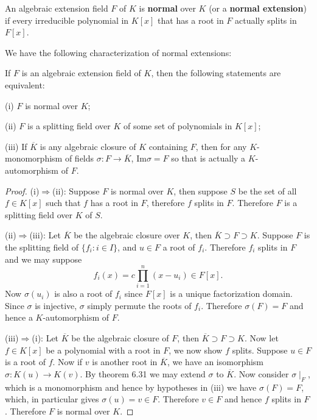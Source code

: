 \begin{definition}
An algebraic extension field $F$ of $K$ is \textbf{normal} over $K$ (or a \textbf{normal extension}) if every irreducible polynomial in $K[x]$ that has a root in $F$ actually splits in $F[x]$.
\end{definition}
We have the following characterization of normal extensions: 
\begin{theorem}
If $F$ is an algebraic extension field of $K$, then the following statements are equivalent: \par
(i) $F$ is normal over $K$;\par
(ii) $F$ is a splitting field over $K$ of some set of polynomials in $K[x]$;\par
(iii) If $\overline{K}$ is any algebraic closure of $K$ containing $F$, then for any $K$-monomorphism of fields $\sigma:F\to\overline{K}$, $\mathrm{Im}\sigma=F$ so that is actually a $K$-automorphism of $F$.
\end{theorem}
\begin{proof}
(i)$\Rightarrow$(ii): Suppose $F$ is normal over $K$, then suppose $S$ be the set of all $f\in K[x]$ such that $f$ has a root in $F$, therefore $f$ splits in $F$. Therefore $F$ is a splitting field over $K$ of $S$.\par
(ii)$\Rightarrow$(iii): Let $\overline{K}$ be the algebraic closure over $K$, then $\overline{K}\supset F\supset K$. Suppose $F$ is the splitting field of $\{f_i:i\in I\}$, and $u\in F$ a root of $f_i$. Therefore $f_i$ splits in $F$ and we may suppose 
$$
f_i\left( x \right) =c\prod_{i=1}^n{\left( x-u_i \right)}\in F\left[ x \right] .
$$
Now $\sigma(u_i)$ is also a root of $f_i$ since $F[x]$ is a unique factorization domain. Since $\sigma$ is injective, $\sigma$ simply permute the roots of $f_i$. Therefore $\sigma(F)=F$ and hence a $K$-automorphism of $F$.\par
(iii)$\Rightarrow$(i): Let $\overline{K}$ be the algebraic closure of $F$, then $\overline{K}\supset F\supset K$. Now let $f\in K[x]$ be a polynomial with a root in $F$, we now show $f$ splits. Suppose $u\in F$ is a root of $f$. Now if $v$ is another root in $\overline{K}$, we have an isomorphism $\sigma:K(u)\to K(v)$. By theorem 6.31 we may extend $\sigma$ to $\overline{K}$. Now consider $\sigma\mid_F$, which is a monomorphism and hence by hypotheses in (iii) we have $\sigma(F)=F$, which, in particular gives $\sigma(u)=v\in F$. Therefore $v\in F$ and hence $f$ splits in $F$. Therefore $F$ is normal over $K$.
\end{proof}
